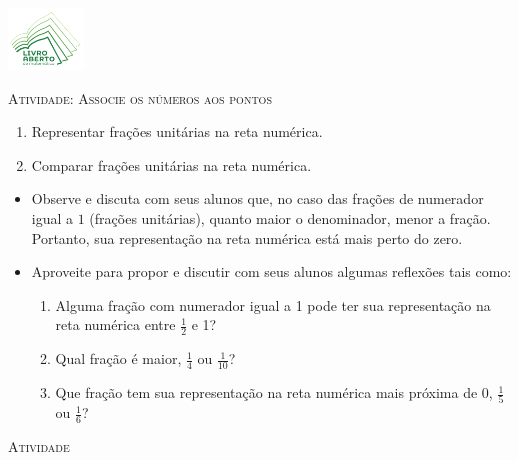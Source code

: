 \documentclass[10 pt,usenames,dvipsnames, oneside]{article}
\begin{document}
\begin{center}
  \begin{minipage}[l]{3cm}
\includegraphics[width=2cm]{../../../Figuras/logo}       
\end{minipage}\hfill
\begin{minipage}[r]{.8\textwidth}
 {\Large \scshape Atividade: Associe os números aos pontos}  
\end{minipage}
\end{center}
\vspace{.2cm}

\ifdefined\prof
\begin{goals}
\begin{enumerate}
\item Representar frações unitárias na reta numérica.
\item Comparar frações unitárias na reta numérica.
\end{enumerate}

\tcblower

\begin{itemize}
\item  Observe e discuta com seus alunos que, no caso das frações de numerador igual a $1$ (frações unitárias), quanto maior o denominador, menor a fração. Portanto, sua representação na reta numérica está mais perto do zero.
\item  Aproveite para propor e discutir com seus alunos algumas reflexões tais como:
   \begin{enumerate}[label=\alph*)]
    \item Alguma fração com numerador igual a 1 pode ter sua representação na reta numérica entre $\frac{1}{2}$ e 1?
    \item Qual fração é maior, $\frac{1}{4}$ ou $\frac{1}{10}$?
    \item Que fração tem sua representação na reta numérica mais próxima de 0, $\frac{1}{5}$ ou $\frac{1}{6}$?
   \end{enumerate}
\end{itemize}
\end{goals}

\bigskip
\begin{center}
{\large \scshape Atividade}
\end{center}
\fi
\end{document}
